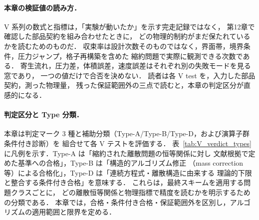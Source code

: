 \paragraph{本章の検証値の読み方．}
V 系列の数式と指標は，「実験が動いたか」を示す完走記録ではなく，
第12章で確認した部品契約を組み合わせたときに，
どの物理的制約がまだ保たれているかを読むためのものだ．
収束率は設計次数そのものではなく，界面帯，境界条件，圧力ジャンプ，格子再構築を含めた
縮約問題で実際に観測できる次数である．
寄生流れ，圧力差，体積誤差，速度誤差はそれぞれ別の失敗モードを見る窓であり，
一つの値だけで合否を決めない．
読者は各 V test を，入力した部品契約，測った物理量，
残った保証範囲外の三点で読むと，本章の判定区分が直感的になる．

\paragraph{判定区分と Type 分類．}
本章は判定マーク 3 種と補助分類（Type-A/Type-B/Type-D，および演算子群条件付き診断）を
組合せて各 V テストを評価する．
表~\ref{tab:V_verdict_types} に凡例を示す．Type-A は「縮約された離散問題の恒等関係に対し
文献根拠で定めた基準への合格」，Type-B は「構造的アルゴリズム修正
（mass correction 等）による合格化」，Type-D は「連続方程式・離散構造に由来する
理論的下限と整合する条件付き合格」を意味する．
これらは，最終スキームを適用する問題クラスごとに，
どの離散恒等関係と物理指標で精度を読むかを明示するための分類である．
本章では，合格・条件付き合格・保証範囲外を区別し，アルゴリズムの適用範囲と限界を定める．

